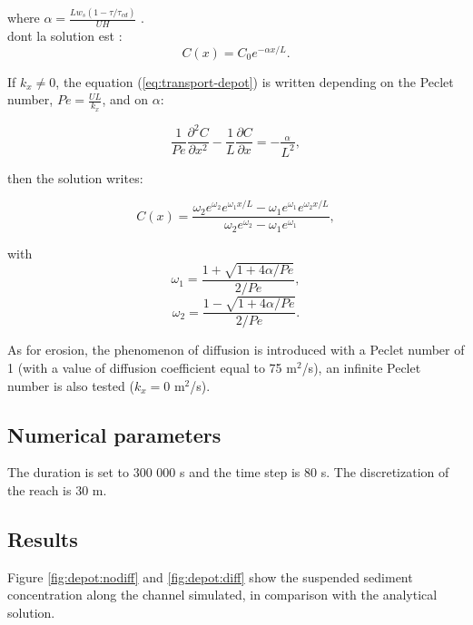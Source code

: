 where $ \alpha = \frac{Lw_s (1-\tau/\tau_{cd})  }{UH} $ .\\

 dont la solution est :
\begin{equation}
C(x)=C_0 e^{-\alpha x /L}.
\label{eq:sol4}
\end{equation}

If $k_x\neq 0$, the equation (\ref{eq:transport-depot}) is written
depending on the Peclet number, $Pe=\frac{UL}{k_x}$, and on $\alpha$:

\begin{equation}
\frac{1}{Pe} \frac{\partial^2 C}{\partial x^2} -
\frac{1}{L} \frac{\partial C}{\partial x} =
- \frac{ _\alpha}{ L^2},
\label{eq:sol-transport}
\end{equation}

then the solution writes:

\begin{equation}
C(x)= \frac{ \omega_2 e^{\omega_2} e^{\omega_1 x/L} -
\omega_1 e^{\omega_1} e^{\omega_2 x/L}}{ \omega_2 e^{\omega_2}-
\omega_1 e^{\omega_1}  },
\label{eq:}
\end{equation}

with
\begin{equation}
\omega _1 = \frac{ 1 + \sqrt{1+4 \alpha/Pe}  }{2/Pe},
\label{eq:}
\end{equation}
\begin{equation}
\omega _2 = \frac{ 1 - \sqrt{1+4 \alpha/Pe}  }{2/Pe}.
\label{eq:}
\end{equation}

As for erosion, the phenomenon of diffusion is introduced with a Peclet
number of 1 (with a value of diffusion coefficient equal to 75
m$^2$/s), an infinite Peclet number is also tested ($k_x=0$ m$^2$/s).

\subsection{Numerical parameters}

The duration is set to 300 000 s and the time step is 80 s.
The discretization of the reach is 30 m.

\subsection{Results}

Figure \ref{fig:depot:nodiff} and \ref{fig:depot:diff} show the
suspended sediment concentration along the channel simulated, in
comparison with the analytical solution.

